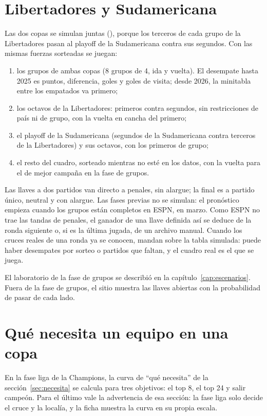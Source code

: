 \section{Libertadores y Sudamericana}

Las dos copas se simulan juntas (), porque los terceros de cada grupo de la Libertadores pasan al playoff de la Sudamericana contra sus segundos. Con las mismas fuerzas sorteadas se juegan:

\begin{enumerate}
\item los grupos de ambas copas (8 grupos de 4, ida y vuelta). El desempate hasta 2025 es puntos, diferencia, goles y goles de visita; desde 2026, la minitabla entre los empatados va primero;
\item los octavos de la Libertadores: primeros contra segundos, sin restricciones de país ni de grupo, con la vuelta en cancha del primero;
\item el playoff de la Sudamericana (segundos de la Sudamericana contra terceros de la Libertadores) y sus octavos, con los primeros de grupo;
\item el resto del cuadro, sorteado mientras no esté en los datos, con la vuelta para el de mejor campaña en la fase de grupos.
\end{enumerate}

Las llaves a dos partidos van directo a penales, sin alargue; la final es a partido único, neutral y con alargue. Las fases previas no se simulan: el pronóstico empieza cuando los grupos están completos en ESPN, en marzo. Como ESPN no trae las tandas de penales, el ganador de una llave definida así se deduce de la ronda siguiente o, si es la última jugada, de un archivo manual. Cuando los cruces reales de una ronda ya se conocen, mandan sobre la tabla simulada: puede haber desempates por sorteo o partidos que faltan, y el cuadro real es el que se juega.

El laboratorio de la fase de grupos se describió en la capítulo~\ref{cap:escenarios}. Fuera de la fase de grupos, el sitio muestra las llaves abiertas con la probabilidad de pasar de cada lado.

\section{Qué necesita un equipo en una copa}

En la fase liga de la Champions, la curva de ``qué necesita'' de la sección~\ref{sec:necesita} se calcula para tres objetivos: el top 8, el top 24 y salir campeón. Para el último vale la advertencia de esa sección: la fase liga solo decide el cruce y la localía, y la ficha muestra la curva en su propia escala.
